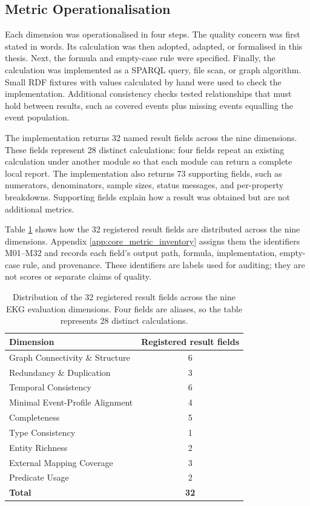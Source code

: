 \subsection{Metric Operationalisation}

Each dimension was operationalised in four steps. The quality concern was first stated in words. Its calculation was then adopted, adapted, or formalised in this thesis. Next, the formula and empty-case rule were specified. Finally, the calculation was implemented as a SPARQL query, file scan, or graph algorithm. Small RDF fixtures with values calculated by hand were used to check the implementation. Additional consistency checks tested relationships that must hold between results, such as covered events plus missing events equalling the event population.

The implementation returns 32 named result fields across the nine dimensions. These fields represent 28 distinct calculations: four fields repeat an existing calculation under another module so that each module can return a complete local report. The implementation also returns 73 supporting fields, such as numerators, denominators, sample sizes, status messages, and per-property breakdowns. Supporting fields explain how a result was obtained but are not additional metrics.

Table \ref{tab:metrics_summary} shows how the 32 registered result fields are distributed across the nine dimensions. Appendix \ref{app:core_metric_inventory} assigns them the identifiers M01--M32 and records each field's output path, formula, implementation, empty-case rule, and provenance. These identifiers are labels used for auditing; they are not scores or separate claims of quality.

\begin{table}[H]
\centering
\caption{Distribution of the 32 registered result fields across the nine EKG evaluation dimensions. Four fields are aliases, so the table represents 28 distinct calculations.}
\label{tab:metrics_summary}
\begin{tabular}{lc}
\toprule
\textbf{Dimension} & \textbf{Registered result fields} \\
\midrule
Graph Connectivity \& Structure & 6 \\
Redundancy \& Duplication & 3 \\
Temporal Consistency & 6 \\
Minimal Event-Profile Alignment & 4 \\
Completeness & 5 \\
Type Consistency & 1 \\
Entity Richness & 2 \\
External Mapping Coverage & 3 \\
Predicate Usage & 2 \\
\midrule
\textbf{Total} & \textbf{32} \\
\bottomrule
\end{tabular}
\end{table}

